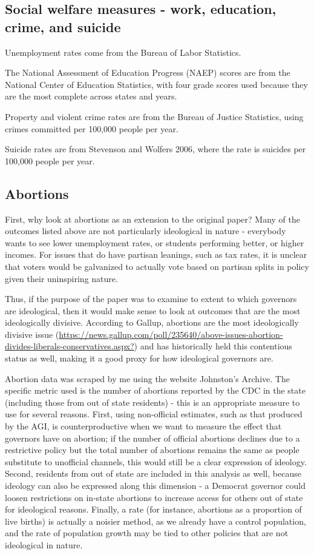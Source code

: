 \documentclass{article}
\begin{document}
\subsection{Social welfare measures - work, education, crime, and suicide}

Unemployment rates come from the Bureau of Labor Statistics.

The National Assessment of Education Progress (NAEP) scores are from the National Center of Education Statistics, with four grade scores used because they are the most complete across states and years.

Property and violent crime rates are from the Bureau of Justice Statistics, using crimes committed per 100,000 people per year.

Suicide rates are from Stevenson and Wolfers 2006, where the rate is suicides per 100,000 people per year.

\subsection{Abortions}

First, why look at abortions as an extension to the original paper? Many of the outcomes listed above are not particularly ideological in nature - everybody wants to see lower unemployment rates, or students performing better, or higher incomes. For issues that do have partisan leanings, such as tax rates, it is unclear that voters would be galvanized to actually vote based on partisan splits in policy given their uninspiring nature.

Thus, if the purpose of the paper was to examine to extent to which governors are ideological, then it would make sense to look at outcomes that are the most ideologically divisive. According to Gallup, abortions are the most ideologically divisive issue (\url{https://news.gallup.com/poll/235640/above-issues-abortion-divides-liberals-conservatives.aspx?}) and has historically held this contentious status as well, making it a good proxy for how ideological governors are.

Abortion data was scraped by me using the website Johnston's Archive. The specific metric used is the number of abortions reported by the CDC in the state (including those from out of state residents) - this is an appropriate measure to use for several reasons. First, using non-official estimates, such as that produced by the AGI, is counterproductive when we want to measure the effect that governors have on abortion; if the number of official abortions declines due to a restrictive policy but the total number of abortions remains the same as people substitute to unofficial channels, this would still be a clear expression of ideology. Second, residents from out of state are included in this analysis as well, because ideology can also be expressed along this dimension - a Democrat governor could loosen restrictions on in-state abortions to increase access for others out of state for ideological reasons. Finally, a rate (for instance, abortions as a proportion of live births) is actually a noisier method, as we already have a control population, and the rate of population growth may be tied to other policies that are not ideological in nature.
\end{document}

